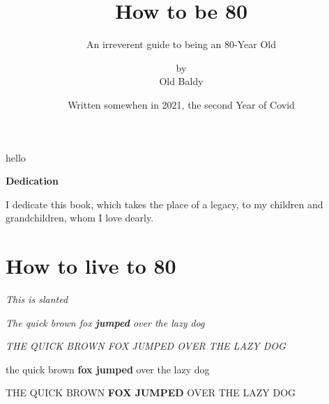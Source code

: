 \documentclass[15pt, landscape, oneside]{scrbook}
\title{{\Huge \textbf{How to be 80}}}
\subtitle{{\normalsize An irreverent guide to being an 80-Year Old}}
\author{by \\ Old Baldy}
\date{{\small Written somewhen in 2021, the second Year of Covid}}
\begin{document}
\begin{frontmatter}
hello		
\maketitle[1]
\begin{center}
	{\LARGE \textbf{Dedication}}
	
	I dedicate this book, which takes the place of a legacy, to my children and grandchildren, whom I love dearly.
\end{center}
\end{frontmatter}

	\chapter*{How to live to 80}

	\textsl{This is slanted}
	
	\textit{The quick brown fox \textbf{jumped} over the lazy dog} 
	
	\textit{THE QUICK BROWN FOX JUMPED OVER THE LAZY DOG}
	
	the quick brown \textbf{fox jumped} over the lazy dog
	
	THE QUICK BROWN \textbf{FOX JUMPED} OVER THE LAZY DOG
	
	
	
	
	
	\lipsum[20-23]
	
	\textit{\lipsum[30-33]}
\end{document}
